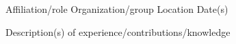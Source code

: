 

\begin{cventries}

  \cventry
  {Affiliation/role} %
  {Organization/group} %
  {Location} %
  {Date(s)} %
  {
    \begin{cvitems} %
      \item {Description(s) of experience/contributions/knowledge}
    \end{cvitems}
  }

\end{cventries}
